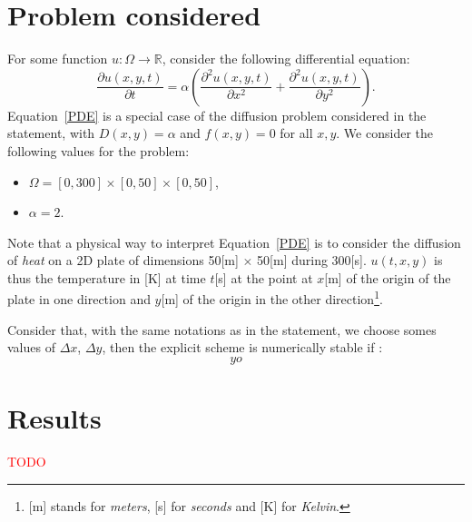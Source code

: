 \documentclass{article}
\begin{document}
\cfoot{}

\section{Problem considered}
For  some function $u: \Omega \to \mathbb{R}$, consider the following differential equation:
\begin{equation}
\label{PDE}
	\frac{\partial u(x, y, t)}{\partial t} = \alpha \left( \frac{\partial^2 u(x, y, t)}{\partial x^2} + \frac{\partial^2 u(x, y, t)}{\partial y^2} \right).
\end{equation}
Equation~\eqref{PDE} is a special case of the diffusion problem considered in the statement, with $D(x, y) = \alpha$ and $f(x, y) = 0$ for all $x, y$. We consider the following values for the problem: 
\begin{itemize}
	\item $\Omega = [0, 300] \times [0, 50] \times [0, 50]$,
	\item $\alpha = 2$.
\end{itemize}
Note that a physical way to interpret Equation~\eqref{PDE} is to consider the diffusion of \emph{heat} on a 2D plate of dimensions 50[m] $\times$ 50[m] during 300[s]. $u(t, x, y)$ is thus the temperature in [K] at time $t$[s] at the point at $x$[m] of the origin of the plate in one direction and $y$[m] of the origin in the other direction\footnote{[m] stands for \emph{meters}, [s] for \emph{seconds} and [K] for \emph{Kelvin}.}. 

Consider that, with the same notations as in the statement, we choose somes values of $\Delta x$, $\Delta y$, then the explicit scheme is numerically stable if \cite[Equations (3.5), (3.6)]{morton_mayers_2005}:
\begin{equation}
	yo
\end{equation}

\section{Results}

\textcolor{red}{TODO}

\end{document}
